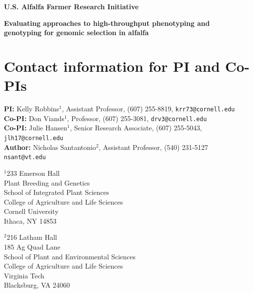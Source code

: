 \documentclass[12pt, letterpaper]{article}
\author{Nicholas Santantonio}
\date{\today}
\begin{document}
\begin{center}
\large{\textbf{U.S. Alfalfa Farmer Research Initiative}}
\end{center}


\begin{center}
\Large{\textbf{Evaluating approaches to high-throughput phenotyping and genotyping for genomic selection in alfalfa}}
\end{center}



\section*{Contact information for PI and Co-PIs}
	
\noindent \textbf{PI:} Kelly Robbins$^1$, Assistant Professor, (607) 255-8819, \texttt{krr73@cornell.edu}\\
\noindent \textbf{Co-PI:} Don Viands$^1$, Professor, (607) 255-3081, \texttt{drv3@cornell.edu}\\
\noindent \textbf{Co-PI:} Julie Hansen$^1$, Senior Research Associate, (607) 255-5043, \texttt{jlh17@cornell.edu}\\
\noindent \textbf{Author:} Nicholas Santantonio$^2$, Assistant Professor, (540) 231-5127 \texttt{nsant@vt.edu} 

\bigskip

\begin{minipage}{0.5\linewidth}
\noindent $^1$233 Emerson Hall\\
Plant Breeding and Genetics\\
School of Integrated Plant Sciences\\
College of Agriculture and Life Sciences\\
Cornell University\\
Ithaca, NY 14853
\end{minipage}
\begin{minipage}{0.5\linewidth}
\noindent $^2$216 Latham Hall \\
185 Ag Quad Lane \\
School of Plant and Environmental Sciences \\
College of Agriculture and Life Sciences \\
Virginia Tech \\
Blacksburg, VA 24060
\end{minipage}
\end{document}
